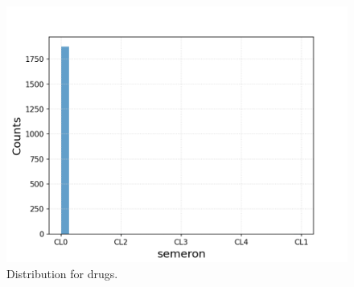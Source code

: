 \documentclass{article}
\begin{document}
\begin{figure}[h!]
\begin{minipage}[b]{0.32\textwidth}
	\end{minipage}
	\begin{minipage}[b]{0.32\textwidth}
		\includegraphics[width=\textwidth]{plots/drugsPlots/semeron.png}
	\end{minipage}
	\caption{Distribution for drugs.}
\label{drugs1}
\end{figure}
\end{document}
